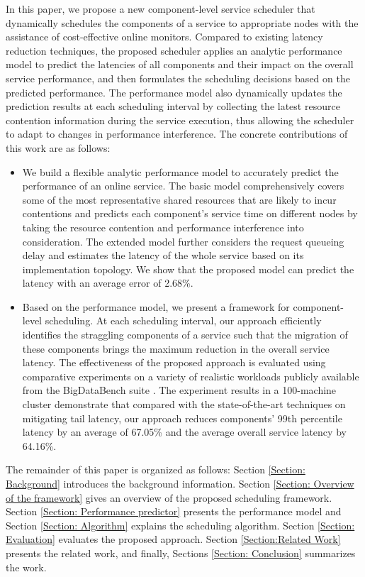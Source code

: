 \documentclass[10pt, conference, compsocconf]{IEEEtran}
\begin{document}
In this paper, we propose a new component-level service scheduler that dynamically schedules the components of a service to appropriate nodes with the assistance of cost-effective online monitors. Compared to existing latency reduction techniques, the proposed scheduler applies an analytic performance model to predict the latencies of all components and their impact on the overall service performance, and then formulates the scheduling decisions based on the predicted performance. The performance model also dynamically updates the prediction results at each scheduling interval by collecting the latest resource contention information during the service execution, thus allowing the scheduler to adapt to changes in performance interference. The concrete contributions of this work are as follows:
\begin{itemize}
\item  We build a flexible analytic performance model to accurately predict the performance of an online service. The basic model comprehensively covers some of the most representative shared resources that are likely to incur contentions and predicts each component's service time on different nodes by taking the resource contention and performance interference into consideration. The extended model further considers the request queueing delay and estimates the latency of the whole service based on its implementation topology. We show that the proposed model can predict the latency with an average error of 2.68\%.
\item  Based on the performance model, we present a framework for component-level scheduling. At each scheduling interval, our approach efficiently identifies the straggling components of a service such that the migration of these components brings the maximum reduction in the overall service latency. The effectiveness of the proposed approach is evaluated using comparative experiments on a variety of realistic workloads publicly available from the BigDataBench suite \cite{opensourceBigDataBench}. The experiment results in a 100-machine cluster demonstrate that compared with the state-of-the-art techniques on mitigating tail latency, our approach reduces components' 99th percentile latency by an average of 67.05\% and the average overall service latency by 64.16\%.
\end{itemize}
The remainder of this paper is organized as follows: Section \ref{Section: Background} introduces the background information. Section \ref{Section: Overview of the framework} gives an overview of the proposed scheduling framework. Section \ref{Section: Performance predictor} presents the performance model and Section \ref{Section: Algorithm} explains the scheduling algorithm. Section \ref{Section: Evaluation} evaluates the proposed approach. Section \ref{Section:Related Work} presents the related work, and finally, Sections \ref{Section: Conclusion} summarizes the work.
\end{document}
